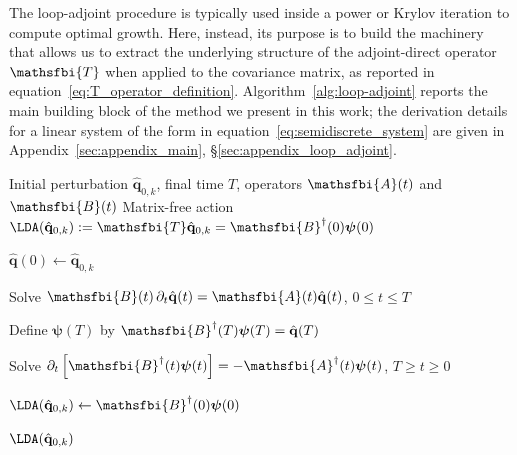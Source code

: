 The loop-adjoint procedure is typically used inside a power or Krylov iteration \citep{barkeley-blackburn-sherwin-2008} to compute optimal growth. Here, instead, its purpose is to build the machinery that allows us to extract the underlying structure of the adjoint-direct operator \(\mathsfbi{T}\) when applied to the covariance matrix, as reported in equation~\eqref{eq:T_operator_definition}. Algorithm~\ref{alg:loop-adjoint} reports the main building block of the method we present in this work; the derivation details for a linear system of the form in equation~\eqref{eq:semidiscrete_system} are given in Appendix~\ref{sec:appendix_main}, \S\ref{sec:appendix_loop_adjoint}.
\begin{algorithm}[t]
  \caption{Matrix-free loop-direct-adjoint (LDA) action of \(\mathsfbi{T}\)}
  \label{alg:loop-adjoint}

  \begin{algorithmic}[1]
    \Require Initial perturbation \(\hat{\mathbf{q}}_{0,k}\), final time \(T\),
             operators \(\mathsfbi{A}(t)\) and \(\mathsfbi{B}(t)\)
    \Ensure Matrix-free action
      \(\LDA(\hat{\mathbf{q}}_{0,k})
      :=
      \mathsfbi{T}\hat{\mathbf{q}}_{0,k}
      =
      \mathsfbi{B}^{\dagger}(0)\boldsymbol{\psi}(0)\)

    \State \(\hat{\mathbf{q}}(0)\gets\hat{\mathbf{q}}_{0,k}\)

    \State Solve
      \(\mathsfbi{B}(t)\,\partial_t\hat{\mathbf{q}}(t)
      =
      \mathsfbi{A}(t)\hat{\mathbf{q}}(t)\),
      \(0\leq t\leq T\)

    \State Define \(\boldsymbol{\psi}(T)\) by
      \(\mathsfbi{B}^{\dagger}(T)\boldsymbol{\psi}(T)
      =
      \hat{\mathbf{q}}(T)\)

    \State Solve
      \(\partial_t
      \left[
        \mathsfbi{B}^{\dagger}(t)\boldsymbol{\psi}(t)
      \right]
      =
      -\mathsfbi{A}^{\dagger}(t)\boldsymbol{\psi}(t)\),
      \(T\geq t\geq 0\)

    \State \(\LDA(\hat{\mathbf{q}}_{0,k})
      \gets
      \mathsfbi{B}^{\dagger}(0)\boldsymbol{\psi}(0)\)

    \State \Return \(\LDA(\hat{\mathbf{q}}_{0,k})\)
  \end{algorithmic}
\end{algorithm}
